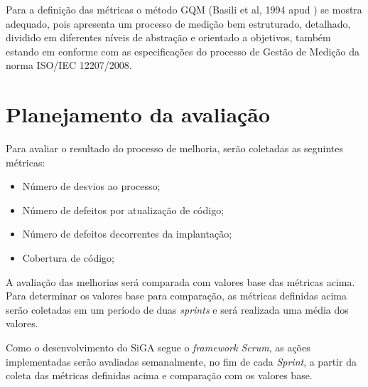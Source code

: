 Para a definição das métricas o método GQM (Basili et al, 1994 apud \cite{solingen99}) se mostra adequado, 
pois apresenta um processo de medição bem estruturado, detalhado, dividido em diferentes níveis de abstração
e orientado a objetivos, também estando em conforme com as especificações do processo de Gestão de Medição
da norma ISO/IEC 12207/2008.

\section{Planejamento da avaliação}
    
    Para avaliar o resultado do processo de melhoria, serão coletadas as seguintes métricas:
    
    \begin{itemize}
      \item Número de desvios ao processo;
      \item Número de defeitos por atualização de código;
      \item Número de defeitos decorrentes da implantação;
      \item Cobertura de código;
    \end{itemize}
    
    A avaliação das melhorias será comparada com valores base das métricas acima. Para determinar os valores base para comparação, 
    as métricas definidas acima serão coletadas em um período de duas \textit{sprints} e será realizada uma média dos valores.
    
    Como o desenvolvimento do SiGA segue o \textit{framework Scrum}, as ações implementadas serão avaliadas semanalmente,
    no fim de cada \textit{Sprint}, a partir da coleta das métricas definidas acima e comparação com os valores base.